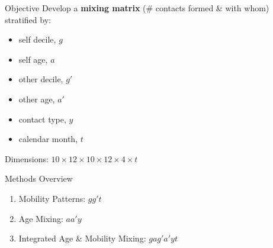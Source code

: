 \begin{frame}{Objective}
  Develop a \textbf{mixing matrix} (\# contacts formed \& with whom) stratified by:
  \bigpar
  \begin{minipage}{.33\linewidth}
    \begin{itemize}
      \item self decile, $g$
      \item self age, $a$
    \end{itemize}
  \end{minipage}%
  \begin{minipage}{.33\linewidth}
    \begin{itemize}
      \item other decile, $g'$
      \item other age, $a'$
    \end{itemize}
  \end{minipage}%
  \begin{minipage}{.33\linewidth}
    \begin{itemize}
      \item contact type, $y$
      \item calendar month, $t$
    \end{itemize}
  \end{minipage}
  \bigpar
  Dimensions: $10 \times 12 \times 10 \times 12 \times 4 \times t$
\end{frame}
\begin{frame}{Methods Overview}
  \begin{enumerate}
    \item Mobility Patterns: $gg't$
    \item Age Mixing: $aa'y$
    \item Integrated Age \& Mobility Mixing: $gag'a'yt$
  \end{enumerate}
\end{frame}
